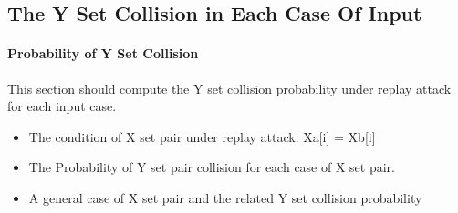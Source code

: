 \documentclass{article}
\begin{document}
\subsection{The Y Set Collision in Each Case Of Input}
\paragraph{Probability of Y Set Collision}
This section should compute the Y set collision probability under replay attack for each input case.
\begin{itemize}
	\item The condition of X set pair under replay attack: Xa[i] = Xb[i]
	\item The Probability of Y set pair collision for each case of X set pair.
	\item A general case of X set pair and the related Y set collision probability
\end{itemize}
\end{document}
